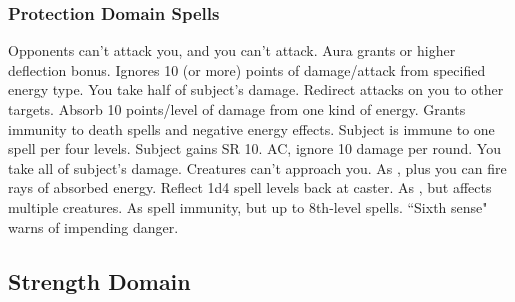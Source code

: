 \subsubsection{Protection Domain Spells}
\begin{spelllist}
 Opponents can't attack you, and you can't attack.
 Aura grants  or higher deflection bonus.
 Ignores 10 (or more) points of damage/attack from specified energy type.
\F You take half of subject's damage.
 Redirect attacks on you to other targets.
 Absorb 10 points/level of damage from one kind of energy.
 Grants immunity to death spells and negative energy effects.
 Subject is immune to one spell per four levels.
 Subject gains SR 10.
  AC, ignore 10 damage per round.
 You take all of subject's damage.
 Creatures can't approach you.
 As , plus you can fire rays of absorbed energy.
 Reflect 1d4 spell levels back at caster.
 As , but affects multiple creatures.
 As spell immunity, but up to 8th-level spells.
 ``Sixth sense" warns of impending danger.
\spellhead[9]{}
\end{spelllist}

\subsection{Strength Domain}

